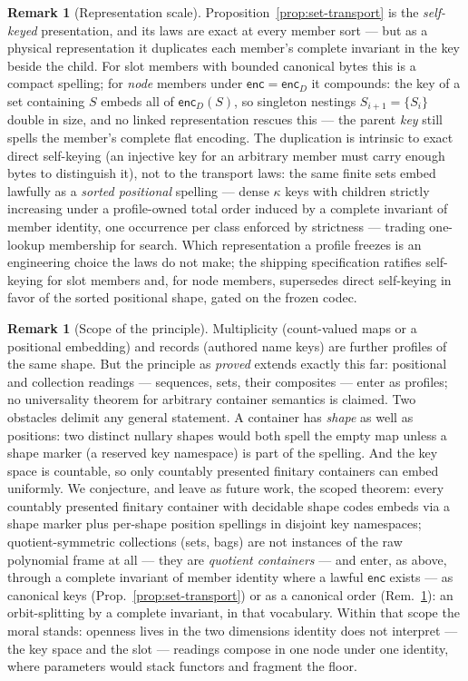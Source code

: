 \documentclass[11pt]{article}
\theoremstyle{definition}
\newtheorem{remark}[theorem]{Remark}
\newcommand{\enc}{\mathsf{enc}}
\newcommand{\encD}{\mathsf{enc}_{\!D}}
\begin{document}
\begin{remark}[Representation scale]\label{rem:setscale}
Proposition~\ref{prop:set-transport} is the \emph{self-keyed} presentation, and its
laws are exact at every member sort --- but as a physical representation it
duplicates each member's complete invariant in the key beside the child. For slot
members with bounded canonical bytes this is a compact spelling; for \emph{node}
members under $\enc = \encD$ it compounds: the key of a set containing $S$ embeds
all of $\encD(S)$, so singleton nestings $S_{i+1} = \{S_i\}$ double in size,
and no linked representation rescues this --- the parent \emph{key} still spells the
member's complete flat encoding. The duplication is intrinsic to exact direct
self-keying (an injective key for an arbitrary member must carry enough bytes to
distinguish it), not to the transport laws: the same finite sets embed lawfully as a
\emph{sorted positional} spelling --- dense $\kappa$ keys with children strictly
increasing under a profile-owned total order induced by a complete invariant of
member identity, one occurrence per class enforced by strictness --- trading
one-lookup membership for search. Which representation a profile freezes is an
engineering choice the laws do not make; the shipping specification ratifies
self-keying for slot members and, for node members, supersedes direct self-keying
in favor of the sorted positional shape, gated on the frozen codec.
\end{remark}

\begin{remark}[Scope of the principle]\label{rem:scope}
Multiplicity (count-valued maps or a positional embedding) and records (authored name
keys) are further profiles of the same shape. But the principle as \emph{proved}
extends exactly this far: positional and collection readings --- sequences, sets,
their composites --- enter as profiles; no universality theorem for arbitrary
container semantics is claimed. Two obstacles delimit any general statement. A
container has \emph{shape} as well as positions: two distinct nullary shapes would
both spell the empty map unless a shape marker (a reserved key namespace) is part of
the spelling. And the key space is countable, so only countably presented finitary
containers can embed uniformly. We conjecture, and leave as future work, the scoped
theorem: every countably presented finitary container with decidable shape codes
embeds via a shape marker plus per-shape position spellings in disjoint key
namespaces; quotient-symmetric collections (sets, bags) are not instances of the raw
polynomial frame at all --- they are \emph{quotient containers} \cite{aagm} --- and
enter, as above, through a complete invariant of member identity where a lawful
$\enc$ exists --- as canonical keys (Prop.~\ref{prop:set-transport}) or as a
canonical order (Rem.~\ref{rem:setscale}): an
orbit-splitting by a complete invariant, in that vocabulary. Within that scope the moral stands: openness lives in the two
dimensions identity does not interpret --- the key space and the slot --- readings
compose in one node under one identity, where parameters would stack functors and
fragment the floor.
\end{remark}
\end{document}
